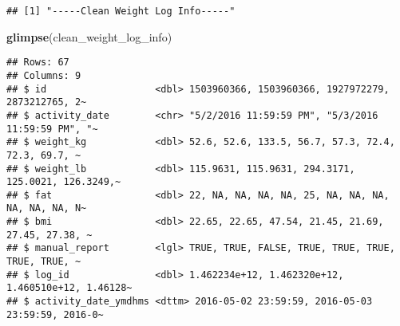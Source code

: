 \documentclass[
]{article}
\newenvironment{Shaded}{\begin{snugshade}}{\end{snugshade}}
\newcommand{\AttributeTok}[1]{\textcolor[rgb]{0.13,0.29,0.53}{#1}}
\newcommand{\CommentTok}[1]{\textcolor[rgb]{0.56,0.35,0.01}{\textit{#1}}}
\newcommand{\FunctionTok}[1]{\textcolor[rgb]{0.13,0.29,0.53}{\textbf{#1}}}
\newcommand{\NormalTok}[1]{#1}
\newcommand{\OtherTok}[1]{\textcolor[rgb]{0.56,0.35,0.01}{#1}}
\newcommand{\SpecialCharTok}[1]{\textcolor[rgb]{0.81,0.36,0.00}{\textbf{#1}}}
\newcommand{\StringTok}[1]{\textcolor[rgb]{0.31,0.60,0.02}{#1}}
\begin{document}
\begin{Shaded}
\end{Shaded}

\begin{verbatim}
## [1] "-----Clean Weight Log Info-----"
\end{verbatim}

\begin{Shaded}
\begin{Highlighting}[]
\FunctionTok{glimpse}\NormalTok{(clean\_weight\_log\_info)}
\end{Highlighting}
\end{Shaded}

\begin{verbatim}
## Rows: 67
## Columns: 9
## $ id                   <dbl> 1503960366, 1503960366, 1927972279, 2873212765, 2~
## $ activity_date        <chr> "5/2/2016 11:59:59 PM", "5/3/2016 11:59:59 PM", "~
## $ weight_kg            <dbl> 52.6, 52.6, 133.5, 56.7, 57.3, 72.4, 72.3, 69.7, ~
## $ weight_lb            <dbl> 115.9631, 115.9631, 294.3171, 125.0021, 126.3249,~
## $ fat                  <dbl> 22, NA, NA, NA, NA, 25, NA, NA, NA, NA, NA, NA, N~
## $ bmi                  <dbl> 22.65, 22.65, 47.54, 21.45, 21.69, 27.45, 27.38, ~
## $ manual_report        <lgl> TRUE, TRUE, FALSE, TRUE, TRUE, TRUE, TRUE, TRUE, ~
## $ log_id               <dbl> 1.462234e+12, 1.462320e+12, 1.460510e+12, 1.46128~
## $ activity_date_ymdhms <dttm> 2016-05-02 23:59:59, 2016-05-03 23:59:59, 2016-0~
\end{verbatim}
\end{document}
